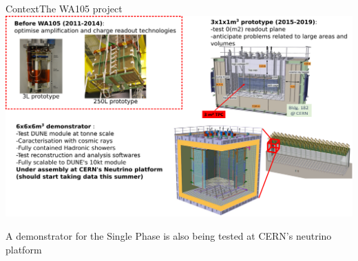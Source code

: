 \documentclass[10pt]{beamer}
\begin{document}
    \begin{frame}{Context}{The WA105 project}
		\includegraphics[width=\linewidth]{figures/contexte/wa105}\\
		\begin{scriptsize}
			A demonstrator for the Single Phase is also being tested at CERN's neutrino platform
		\end{scriptsize}
		
    \end{frame}
    
\end{document}
